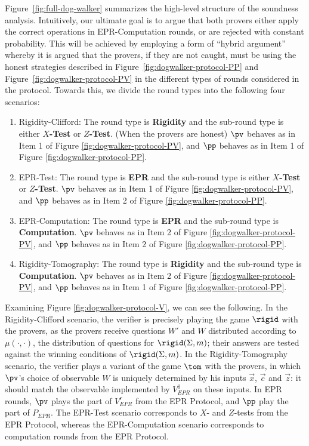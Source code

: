 Figure~\ref{fig:full-dog-walker} summarizes the high-level structure of the soundness analysis. Intuitively, our ultimate goal is to argue that both provers either apply the correct operations in EPR-Computation rounds, or are rejected with constant probability. This will be achieved by employing a form of ``hybrid argument'' whereby it is argued that the provers, if they are not caught, must be using the honest strategies described in Figure~\ref{fig:dogwalker-protocol-PP} and Figure~\ref{fig:dogwalker-protocol-PV} in the different types of rounds considered in the protocol. Towards this, we divide the round types into the following four scenarios:
\begin{enumerate}
\item Rigidity-Clifford: The round type is \textbf{Rigidity} and the sub-round type is either \textbf{$X$-Test} or \textbf{$Z$-Test}. (When the provers are honest) $\pv$ behaves as in Item 1 of Figure \ref{fig:dogwalker-protocol-PV}, and $\pp$ behaves as in Item 1 of Figure \ref{fig:dogwalker-protocol-PP}. 
\item EPR-Test: The round type is \textbf{EPR} and the sub-round type is either \textbf{$X$-Test} or \textbf{$Z$-Test}. $\pv$ behaves as  in Item 1 of Figure \ref{fig:dogwalker-protocol-PV}, and $\pp$ behaves as in Item 2 of Figure \ref{fig:dogwalker-protocol-PP}. 
\item EPR-Computation: The round type is \textbf{EPR} and the sub-round type is \textbf{Computation}. $\pv$ behaves as in Item 2 of Figure \ref{fig:dogwalker-protocol-PV}, and $\pp$ behaves as in Item 2 of Figure \ref{fig:dogwalker-protocol-PP}. 
\item Rigidity-Tomography: The round type is \textbf{Rigidity} and the sub-round type is \textbf{Computation}. $\pv$ behaves as in Item 2 of Figure \ref{fig:dogwalker-protocol-PV}, and $\pp$ behaves as in Item 1 of Figure \ref{fig:dogwalker-protocol-PP}. 
\end{enumerate}
Examining Figure \ref{fig:dogwalker-protocol-V}, we can see the following. In the Rigidity-Clifford scenario, the verifier is precisely playing the game $\rigid$ with the provers, as the provers receive questions $W'$ and $W$ distributed according to $\mu(\cdot,\cdot)$, the distribution of questions for $\rigid(\Sigma,m)$; their answers are tested against the winning conditions of $\rigid(\Sigma,m)$. In the Rigidity-Tomography scenario, the verifier plays a variant of the game $\tom$ with the provers, in which $\pv$'s choice of observable $W$ is uniquely determined by his inputs $\vec{x}$, $\vec{c}$ and $\vec{z}$: it should match the observable implemented by $V_{EPR}^0$ on these inputs. In EPR rounds, $\pv$ plays the part of $V_{EPR}^r$ from the EPR Protocol, and $\pp$ play the part of $P_{EPR}$. The EPR-Test scenario corresponds to $X$- and $Z$-tests from the EPR Protocol, whereas the EPR-Computation scenario corresponds to computation rounds from the EPR Protocol.



